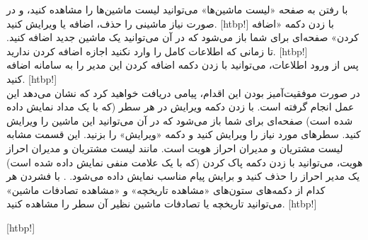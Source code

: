      با رفتن به صفحه «لیست ماشین‌ها» می‌توانید لیست ماشین‌ها را مشاهده کنید، و در صورت نیاز ماشینی را حذف، اضافه یا ویرایش کنید.
    [htbp!]
\newpage
         با زدن دکمه «اضافه کردن» صفحه‌ای برای شما باز می‌شود که در آن می‌توانید یک ماشین جدید اضافه کنید. تا زمانی که اطلاعات کامل را وارد نکنید اجازه اضافه کردن ندارید.
[htbp!]
\\
پس از ورود اطلاعات، می‌توانید با زدن دکمه اضافه کردن این مدیر را به سامانه اضافه کنید.
[htbp!]
\\
در صورت موفقیت‌آمیز بودن این اقدام، پیامی دریافت خواهید کرد که نشان می‌دهد این عمل انجام گرفته است.
 با زدن دکمه ویرایش در هر سطر (که با یک مداد نمایش داده شده است) صفحه‌ای برای شما باز می‌شود که در آن می‌توانید این ماشین را ویرایش کنید. سطرهای مورد نیاز را ویرایش کنید و دکمه «ویرایش» را بزنید. این قسمت مشابه لیست مشتریان و مدیران احراز هویت است.
     مانند لیست مشتریان و مدیران احراز هویت، می‌توانید با زدن دکمه پاک کردن (که با یک علامت منفی نمایش داده شده است) یک مدیر احراز را حذف کنید و برایش پیام مناسب نمایش داده می‌شود.
    .
     با فشردن هر کدام از دکمه‌های ستون‌های «مشاهده تاریخچه» و «مشاهده تصادفات ماشین» می‌توانید تاریخچه یا تصادفات ماشین نظیر آن سطر را مشاهده کنید.
[htbp!]

[htbp!]

\clearpage
{}

